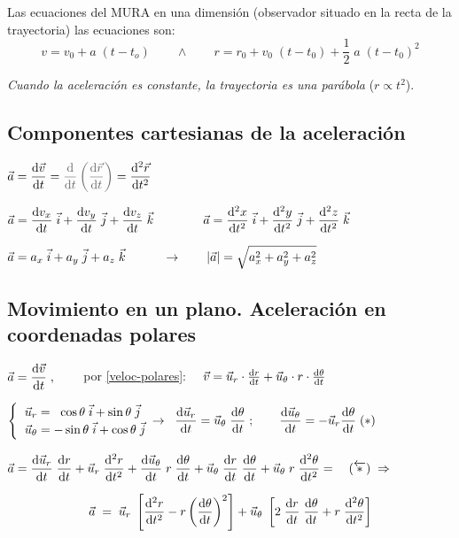 Las ecuaciones del MURA en una dimensión (observador situado en la recta de la trayectoria) las ecuaciones son:
$$v=v_0+a\;(t-t_o) \qquad \wedge \qquad r=r_0+v_0\;(t-t_0)+\dfrac 1 2 \; a \; (t-t_0)^2$$

\emph{Cuando la aceleración es constante, la trayectoria es una parábola} ($r \propto t^2$).


\subsection{Componentes cartesianas de la aceleración}

$\displaystyle \vec a=\dv{\vec v}{t}=\textcolor{gris}{
\dv{t}\left( \dv{\vec r}{t}  \right)
}=\dv[2]{\vec r}{t}$

$\displaystyle 
\vec a=\dv{v_x}{t}\;\vec i+\dv{v_y}{t}\;\vec j+\dv{v_z}{t}\;\vec k
\qquad \qquad
\vec a= \dv[2]{x}{t}\;\vec i+\dv[2]{y}{t}\;\vec j+\dv[2]{z}{t}\;\vec k$

$\displaystyle \vec a=a_x\;\vec i+a_y\;\vec j+a_z\;\vec k \quad \qquad \to \qquad \abs{\vec a}=\sqrt{a_x^2+a_y^2+a_z^2}$

 \subsection{Movimiento en un plano.  Aceleración en coordenadas polares}

$\displaystyle \vec a=\dv{\vec v}{t}\;,\qquad$
por \ref{veloc-polares}: $\quad \vec v=\vec u_r \cdot \dv{r}{t} + \vec u_\theta \cdot r\cdot \dv{\theta}{t} $

$\begin{cases} \;\;\vec u_r=\;\;\cos \theta\; \vec i + \sin \theta\; \vec j \\  \;\;\vec u_\theta = -\sin \theta \; \vec i + \cos \theta \;\vec j \end{cases}  \hspace{-3mm} \to \;\;
\displaystyle \dv{\vec u_r}{t}=\vec u_\theta\; \dv{\theta}{t}\;;  \qquad 
\displaystyle \dv{\vec u_\theta}{t}=-\vec u_r \dv{\theta}{t}\; (*)$




$\displaystyle \vec a =\dv{\vec u_r}{t}\; \dv{r}{t} 
+ \vec u_r\; \dv[2]{r}{t} 
+ \dv{\vec u_\theta}{t}\;r\;\dv{\theta}{t}
+\vec u_\theta\;\dv{r}{t}\;\dv{\theta}{t}
+\vec u_\theta\;r\;\dv[2]{\theta}{t}= \quad (\overleftarrow{*}) \; \Rightarrow$

\begin{equation}
\label{aceleracionpolares}	
\displaystyle \vec a\;=\;\vec u_r\;\left[ \dv[2]{r}{t}-r\left(\dv{\theta}{t} \right)^2 \right] + \vec u_\theta \; \left[ 2\;\dv{r}{t}\;\dv{\theta}{t}+r\;\dv[2]{\theta}{t} \right]
\end{equation}

